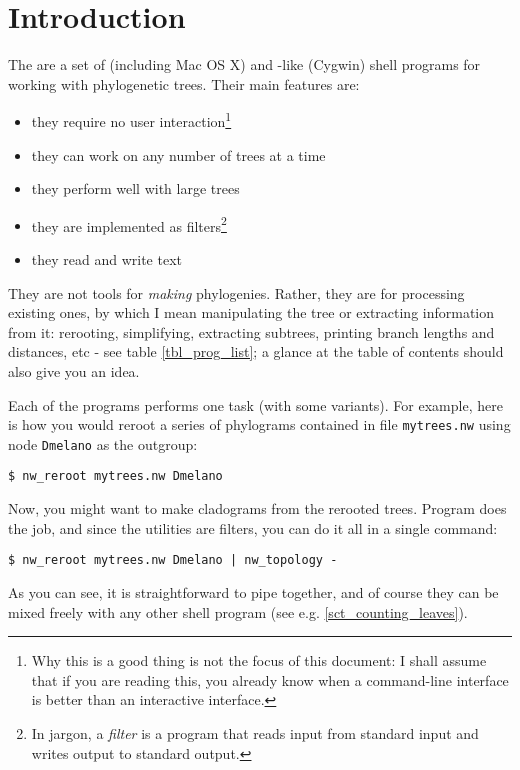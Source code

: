 \clearpage
{}
\chapter*{Introduction}

The \nutils{} are a set of \unix{} (including Mac OS X) and \unix-like (Cygwin) shell programs for working with phylogenetic trees. Their main features are:
\begin{itemize}
 \item they require no user interaction\footnote{Why this is a good thing is not the focus of this document: I shall assume that if you are reading this, you already know when a command-line interface is better than an interactive interface.}
 \item they can work on any number of trees at a time
 \item they perform well with large trees
 \item they are implemented as filters\footnote{In \unix{} jargon, a
 \textit{filter} is a program that reads input from standard input and writes
 output to standard output.}
 \item they read and write text
\end{itemize}
They are not tools for \emph{making} phylogenies. Rather, they are for
processing existing ones, by which I mean manipulating the tree or extracting
information from it: rerooting, simplifying, extracting subtrees, printing
branch lengths and distances, etc - see table \ref{tbl_prog_list}; a glance
at the table of contents should also give you an idea.

Each of the programs performs one task (with some variants). For example, here
is how you would reroot a series of phylograms contained in file
\texttt{mytrees.nw} using node \texttt{Dmelano} as the outgroup:

\begin{verbatim}
$ nw_reroot mytrees.nw Dmelano
\end{verbatim} 
Now, you might want to make cladograms from the rerooted trees. Program
\topology{} does the job, and since the utilities are filters, you can do it
all in a single command:
\begin{verbatim}
$ nw_reroot mytrees.nw Dmelano | nw_topology -
\end{verbatim}
As you can see, it is straightforward to pipe \nutils{} together, and of course they can be mixed freely with any other shell program (see e.g. \ref{sct_counting_leaves}).

